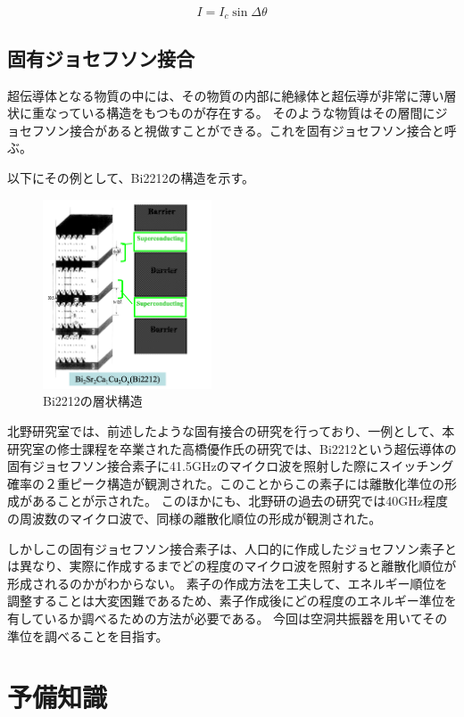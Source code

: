 \[ I = I_c \sin{\Delta \theta } \]

\subsection{固有ジョセフソン接合}
超伝導体となる物質の中には、その物質の内部に絶縁体と超伝導が非常に薄い層状に重なっている構造をもつものが存在する。
そのような物質はその層間にジョセフソン接合があると視做すことができる。これを固有ジョセフソン接合と呼ぶ。

以下にその例として、Bi2212の構造を示す。\cite{びすます}
\vspace{10 mm}

\begin{figure}[h]
  \begin{center}
    \includegraphics[width=5cm]{./image/IJJ.png}
    \caption{Bi2212の層状構造}
    \label{fig:Cavity}
  \end{center}
\end{figure}

北野研究室では、前述したような固有接合の研究を行っており、一例として、本研究室の修士課程を卒業された高橋優作氏の研究\cite{たかはし}では、Bi2212という超伝導体の固有ジョセフソン接合素子に41.5GHzのマイクロ波を照射した際にスイッチング確率の２重ピーク構造が観測された。このことからこの素子には離散化準位の形成があることが示された。
このほかにも、北野研の過去の研究では40GHz程度の周波数のマイクロ波で、同様の離散化順位の形成が観測された。

しかしこの固有ジョセフソン接合素子は、人口的に作成したジョセフソン素子とは異なり、実際に作成するまでどの程度のマイクロ波を照射すると離散化順位が形成されるのかがわからない。
素子の作成方法を工夫して、エネルギー順位を調整することは大変困難であるため、素子作成後にどの程度のエネルギー準位を有しているか調べるための方法が必要である。
今回は空洞共振器を用いてその準位を調べることを目指す。

\section{予備知識}
